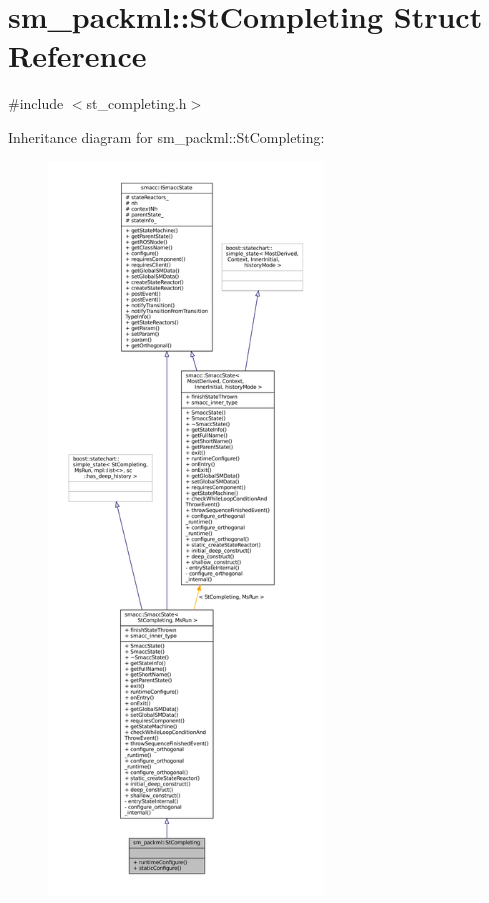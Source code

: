 \hypertarget{structsm__packml_1_1StCompleting}{}\section{sm\+\_\+packml\+:\+:St\+Completing Struct Reference}
\label{structsm__packml_1_1StCompleting}


{\ttfamily \#include $<$st\+\_\+completing.\+h$>$}



Inheritance diagram for sm\+\_\+packml\+:\+:St\+Completing\+:
\nopagebreak
\begin{figure}[H]
\begin{center}
\leavevmode
\includegraphics[height=550pt]{structsm__packml_1_1StCompleting__inherit__graph}
\end{center}
\end{figure}


